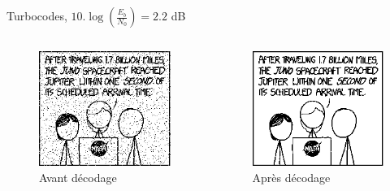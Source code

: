 \documentclass[11pt]{beamer}
\begin{document}
\begin{frame}{Turbocodes, $10.\log(\frac{E_b}{N_0}) = 2.2$ dB}
	\begin{columns}
		\begin{column}{.5\textwidth}
			\begin{figure}
				\includegraphics[scale=0.6]{turbo_noisy_60}\\
				Avant d\'ecodage
			\end{figure}
		\end{column}
		\begin{column}{.5\textwidth}
			\begin{figure}
				\includegraphics[scale=0.6]{turbo_decoded_60}\\
				Apr\`es d\'ecodage
			\end{figure}
		\end{column}
	\end{columns}
\end{frame}
\end{document}
